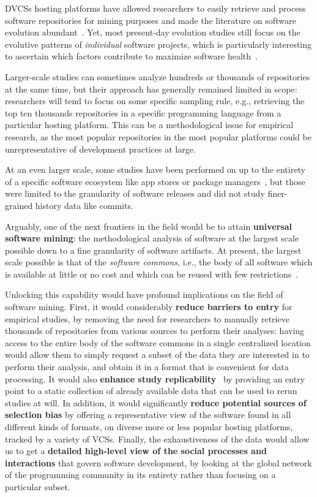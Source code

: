 \glspl{DVCS} hosting platforms have allowed researchers to easily retrieve and
process software repositories for mining purposes and made the literature on
software evolution abundant~\cite{herraiz2013evolution}. Yet, most present-day
evolution studies still focus on the evolutive patterns of \emph{individual}
software projects, which is particularly interesting to ascertain which factors
contribute to maximize software health~\cite{DBLP:conf/icse/2018soheal}.

Larger-scale studies can sometimes analyze hundreds or thousands of
repositories at the same time, but their approach has generally remained
limited in scope: researchers will tend to focus on some specific sampling
rule, e.g., retrieving the top ten thousands repositories in a specific
programming language from a particular hosting platform. This can be a
methodological issue for empirical research, as the most popular repositories
in the most popular platforms could be unrepresentative of development
practices at large.

At an even larger scale, some studies have been performed on up to the entirety
of a specific software ecosystem like app stores or package
managers~\cite{gonzalez2009macro,debsources-ese-2016}, but those were limited
to the granularity of software releases and did not study finer-grained history
data like commits.

Arguably, one of the next frontiers in the field would be to attain
\textbf{universal software mining}: the methodological analysis of software at
the largest scale possible down to a fine granularity of software artifacts.
At present, the largest scale possible is that of the \emph{software commons},
i.e., the body of all software which is available at little or no cost and
which can be reused with few
restrictions~\cite{1999-beagle-in-commons,kranich2008information}.

Unlocking this capability would have profound implications on the field of
software mining. First, it would considerably \textbf{reduce barriers to entry}
for empirical studies, by removing the need for researchers to manually
retrieve thousands of repositories from various sources to perform their
analyses: having access to the entire body of the software commons in a single
centralized location would allow them to simply request a subset of the data
they are interested in to perform their analysis, and obtain it in a format
that is convenient for data processing. It would also \textbf{enhance study
replicability}~\cite{Collberg2016,the-real-software-crisis,ferro2018sigir} by
providing an entry point to a static collection of already available data that
can be used to rerun studies at will.  In addition, it would significantly
\textbf{reduce potential sources of selection bias} by offering a
representative view of the software found in all different kinds of formats, on
diverse more or less popular hosting platforms, tracked by a variety of
\glspl{VCS}.  Finally, the exhaustiveness of the data would allow us to get a
\textbf{detailed high-level view of the social processes and interactions} that
govern software development, by looking at the global network of the
programming community in its entirety rather than focusing on a particular
subset.

